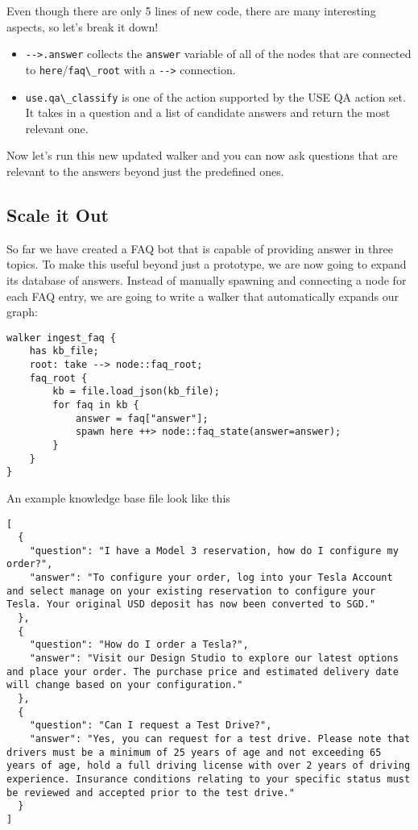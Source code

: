 Even though there are only 5 lines of new code, there are many
interesting aspects, so let's break it down!

\begin{itemize}
\tightlist
\item
  \passthrough{\lstinline!-->.answer!} collects the
  \passthrough{\lstinline!answer!} variable of all of the nodes that are
  connected to
  \passthrough{\lstinline!here!}/\passthrough{\lstinline!faq\_root!}
  with a \passthrough{\lstinline!-->!} connection.
\item
  \passthrough{\lstinline!use.qa\_classify!} is one of the action
  supported by the USE QA action set. It takes in a question and a list
  of candidate answers and return the most relevant one.
\end{itemize}

Now let's run this new updated walker and you can now ask questions that
are relevant to the answers beyond just the predefined ones.

\hypertarget{scale-it-out}{%
\subsection{Scale it Out}\label{scale-it-out}}

So far we have created a FAQ bot that is capable of providing answer in
three topics. To make this useful beyond just a prototype, we are now
going to expand its database of answers. Instead of manually spawning
and connecting a node for each FAQ entry, we are going to write a walker
that automatically expands our graph:

\begin{lstlisting}
walker ingest_faq {
    has kb_file;
    root: take --> node::faq_root;
    faq_root {
        kb = file.load_json(kb_file);
        for faq in kb {
            answer = faq["answer"];
            spawn here ++> node::faq_state(answer=answer);
        }
    }
}
\end{lstlisting}

An example knowledge base file look like this

\begin{lstlisting}
[
  {
    "question": "I have a Model 3 reservation, how do I configure my order?",
    "answer": "To configure your order, log into your Tesla Account and select manage on your existing reservation to configure your Tesla. Your original USD deposit has now been converted to SGD."
  },
  {
    "question": "How do I order a Tesla?",
    "answer": "Visit our Design Studio to explore our latest options and place your order. The purchase price and estimated delivery date will change based on your configuration."
  },
  {
    "question": "Can I request a Test Drive?",
    "answer": "Yes, you can request for a test drive. Please note that drivers must be a minimum of 25 years of age and not exceeding 65 years of age, hold a full driving license with over 2 years of driving experience. Insurance conditions relating to your specific status must be reviewed and accepted prior to the test drive."
  }
]
\end{lstlisting}

